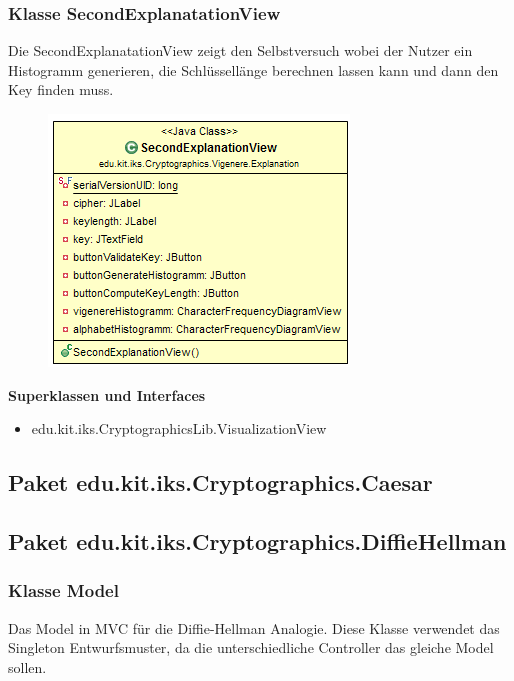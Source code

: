 \documentclass{article}
\begin{document}
    \subsubsection{Klasse SecondExplanatationView}
      Die SecondExplanatationView zeigt den Selbstversuch wobei der Nutzer ein Histogramm generieren, die Schlüssellänge berechnen lassen kann und dann den Key finden muss.
      \begin{figure}[H]
        \centering
        \includegraphics{resources/edu-kit-iks-Cryptographics-Vigenere-SecondExplanationView}
      \end{figure}

      \textbf{Superklassen und Interfaces}
      \begin{itemize}
        \item edu.kit.iks.CryptographicsLib.VisualizationView
      \end{itemize}

\subsection{Paket edu.kit.iks.Cryptographics.Caesar}

\subsection{Paket edu.kit.iks.Cryptographics.DiffieHellman}
\subsubsection{Klasse Model}
      Das Model in MVC für die Diffie-Hellman Analogie.
      Diese Klasse verwendet das Singleton Entwurfsmuster,
      da die unterschiedliche Controller das gleiche Model sollen.
\end{document}
